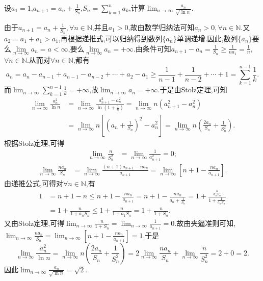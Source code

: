 \documentclass[../../main.tex]{subfiles}%
\begin{document}
\begin{example}
设\(a_1 = 1\),\(a_{n + 1} = a_n + \frac{1}{S_n}\),\(S_n = \sum\limits_{k = 1}^{n} a_k\),计算\(\lim_{n \to \infty} \frac{a_n}{\sqrt{\ln n}}\).
\end{example}
\begin{solution}

由于$a_{n + 1} = a_n + \frac{1}{S_n},\forall n\in \mathbb{N}$,并且$a_1>0$,故由数学归纳法可知$a_n>0,\forall n\in \mathbb{N}$.又$a_2=a_1+a_1>a_1$,再根据递推式,可以归纳得到数列$\{a_n\}$单调递增.因此,数列$\{a_n\}$要么$\underset{n\rightarrow \infty}{\lim}a_n=a<\infty $,要么$\underset{n\rightarrow \infty}{\lim}a_n=+\infty $.由条件可知\(a_{n + 1}-a_n=\frac{1}{S_n}\geqslant\frac{1}{na_1}=\frac{1}{n}\),\(\forall n\in\mathbb{N}\).从而对\(\forall n\in\mathbb{N}\),都有
\[
a_n=a_n - a_{n - 1}+a_{n - 1}-a_{n - 2}+\cdots+a_2 - a_1\geqslant\frac{1}{n - 1}+\frac{1}{n - 2}+\cdots+1=\sum_{k = 1}^{n - 1}\frac{1}{k}.
\]
而\(\lim_{n\rightarrow\infty}\sum_{k = 1}^{n - 1}\frac{1}{k}=+\infty\),故\(\lim_{n\rightarrow\infty}a_n=+\infty\).于是由Stolz定理,可知
\begin{align*}
\lim_{n\rightarrow\infty}\frac{a_n^2}{\ln n}&=\lim_{n\rightarrow\infty}\frac{a_{n + 1}^2 - a_n^2}{\ln(1+\frac{1}{n})}=\lim_{n\rightarrow\infty}n(a_{n + 1}^2 - a_n^2)\\
&=\lim_{n\rightarrow\infty}n\left[\left(a_n+\frac{1}{S_n}\right)^2 - a_n^2\right]=\lim_{n\rightarrow\infty}n\left(\frac{2a_n}{S_n}+\frac{1}{S_n^2}\right).
\end{align*}
根据Stolz定理,可得
\begin{align*}
\lim_{n\rightarrow\infty}\frac{n}{S_n^2}&=\lim_{n\rightarrow\infty}\frac{1}{a_{n + 1}^2}=0;
\end{align*}
\begin{align*}
\lim_{n\rightarrow\infty}\frac{na_n}{S_n}&=\lim_{n\rightarrow\infty}\frac{(n + 1)a_{n + 1}-na_n}{a_{n + 1}}=\lim_{n\rightarrow\infty}\left[n + 1-\frac{na_n}{a_{n + 1}}\right].
\end{align*}
由递推公式,可得对\(\forall n\in\mathbb{N}\),有
\begin{align*}
1&=n + 1 - n\leqslant n + 1-\frac{na_n}{a_{n + 1}}=n + 1-\frac{na_n}{a_n+\frac{1}{S_n}}=1+\frac{\frac{n}{a_nS_n}}{1+\frac{1}{a_nS_n}}\\
&=1+\frac{n}{1 + a_nS_n}\leqslant1+\frac{n}{1 + a_1S_n}=1+\frac{n}{1 + S_n}.
\end{align*}
又由Stolz定理,可得\(\lim_{n\rightarrow\infty}\frac{n}{1 + S_n}=\lim_{n\rightarrow\infty}\frac{1}{a_{n + 1}}=0\).故由夹逼准则可知,\(\lim_{n\rightarrow\infty}\frac{na_n}{S_n}=\lim_{n\rightarrow\infty}\left[n + 1-\frac{na_n}{a_{n + 1}}\right]=1\).于是
\[
\lim_{n\rightarrow\infty}\frac{a_n^2}{\ln n}=\lim_{n\rightarrow\infty}n\left(\frac{2a_n}{S_n}+\frac{1}{S_n^2}\right)=2\lim_{n\rightarrow\infty}\frac{na_n}{S_n}+\lim_{n\rightarrow\infty}\frac{n}{S_n^2}=2 + 0=2.
\]
因此\(\lim_{n\rightarrow\infty}\frac{a_n}{\sqrt{\ln n}}=\sqrt{2}\).

\end{solution}
\end{document}
